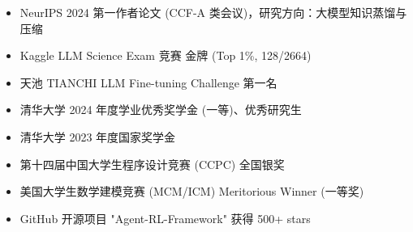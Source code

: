 \documentclass[zh]{resume}
\begin{document}
\begin{itemize}
\begin{itemize}
    \end{itemize}
\end{itemize}

\begin{itemize}
    \item NeurIPS 2024 第一作者论文 (CCF-A 类会议)，研究方向：大模型知识蒸馏与压缩
    \item Kaggle LLM Science Exam 竞赛 金牌 (Top 1\%, 128/2664)
    \item 天池 TIANCHI LLM Fine-tuning Challenge 第一名
    \item 清华大学 2024 年度学业优秀奖学金 (一等)、优秀研究生
    \item 清华大学 2023 年度国家奖学金
    \item 第十四届中国大学生程序设计竞赛 (CCPC) 全国银奖
    \item 美国大学生数学建模竞赛 (MCM/ICM) Meritorious Winner (一等奖)
    \item GitHub 开源项目 "Agent-RL-Framework" 获得 500+ stars
\end{itemize}
\end{document}
